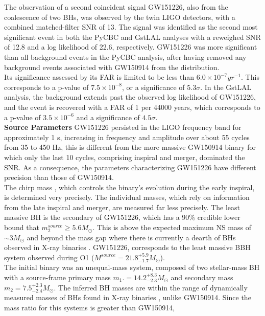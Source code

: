 \documentclass[binding=0.6cm, LaM]{sapthesis}
\begin{document}
	The observation of a second coincident signal GW151226, also from the coalescence of two BHs, 
	was observed by the twin LIGO detectors, with a combined matched-filter SNR of 13. 
	The signal was identified as the second most significant event in both the PyCBC and GstLAL analyses 
	with a reweighed SNR of 12.8 and a log likelihood of 22.6, respectively. 
	GW151226 was more significant than all background events in the PyCBC analysis, 
	after having removed any background events associated with GW150914 from the distribution. \\
	Its significance assessed by its FAR is limited to be less than $6.0 \times 10^{-7} yr^{-1}$. 
	This corresponds to a p-value of $7.5 \times 10^{-8}$, or a significance of $5.3\sigma$. 
	In the GstLAL analysis, the background extends past the observed log likelihood of GW151226, 
	and the event is recovered with a FAR of 1 per 44000 years, which corresponds to a p-value of $3.5\times 10^{-6}$ and a significance of $4.5\sigma$. \\ 
	\textbf{Source Parameters}
	GW151226 persisted in the LIGO frequency band for approximately 1 s, 
	increasing in frequency and amplitude over about 55 cycles from 35 to 450 Hz, 
	this is different from the more massive GW150914 binary for which only the last 10 cycles, 
	comprising inspiral and merger, dominated the SNR. 
	As a consequence, the parameters characterizing GW151226 have different precision than those of GW150914. \\
	The chirp mass  \cite{126, 127}, which controls the binary’s evolution during the early inspiral, is determined very precisely. 
	The individual masses, which rely on information from the late inspiral and merger, are measured far less precisely. 
	The least massive BH is the secondary of GW151226, which has a 90\% credible lower bound that $m^{source}_2 \geq 5.6M_\odot$.
	This is above the expected maximum NS mass of $\sim3M_\odot$ \cite{121, 122} 
	and beyond the mass gap where there is currently a dearth of BHs observed in X-ray binaries \cite{123, 125}. 
	GW151226, corresponds to the least massive BBH system observed during O1 ($M^{source} = 21.8^{+5.9}_{-1.7}M_\odot$). \\
	The initial binary was an unequal-mass system, composed of two stellar-mass BH 
	with a source-frame primary mass $m_1. = 14.2^{+8.3}_{-2.3}M_\odot$ and secondary mass $m_2 = 7.5^{+2.3}_{-2.4}M_\odot$.
	The inferred BH masses are within the range of dynamically measured masses of BHs found in X-ray binaries \cite{128-132}, unlike GW150914. 
	Since the mass ratio for this systems is greater than GW150914,
\end{document}
